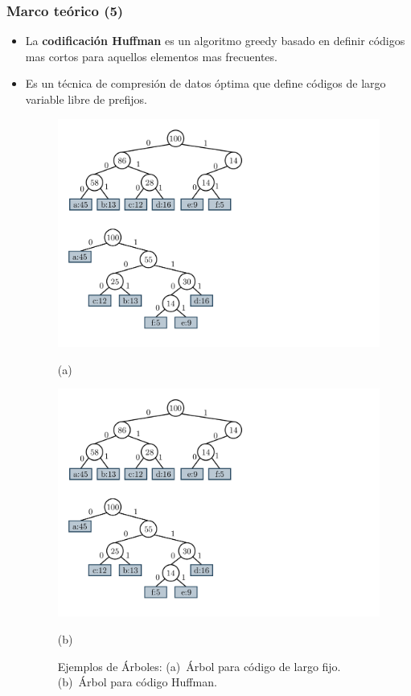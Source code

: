 \begin{frame}
\frametitle{Marco teórico (5)}

\begin{itemize}
	\item La \textbf{codificación Huffman} es un algoritmo greedy basado en definir códigos mas cortos para aquellos elementos mas frecuentes. 
	\item Es un técnica de compresión de datos óptima que define códigos de largo variable libre de prefijos.
	\begin{figure}
    		\centering
    		 	\begin{minipage}{0.45\textwidth}
    		\centering
    		\includegraphics[scale=.3, clip,  trim=20 350 350 20]{../img/graphs-fixVarTrees.pdf}
    		
    		(a)
    	\end{minipage}
    	\begin{minipage}{0.45\textwidth}
    		\centering
    		\includegraphics[scale=.3, clip, trim=20 40 430 280 ]{../img/graphs-fixVarTrees.pdf}
    		
    		(b)
    	\end{minipage}
    	
    		\caption{Ejemplos de Árboles: (a)~Árbol para código de largo fijo. (b)~Árbol para código Huffman.}
    		\label{fig:trees}
	\end{figure}
\end{itemize}

\end{frame}
